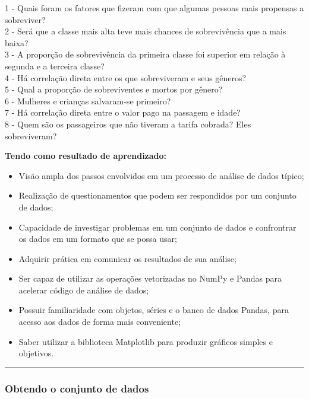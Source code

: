 \documentclass[11pt]{article}
\providecommand{\tightlist}{%
      \setlength{\itemsep}{0pt}\setlength{\parskip}{0pt}}
\begin{document}
1 - Quais foram os fatores que fizeram com que algumas pessoas mais
propensas a sobreviver?\\
2 - Será que a classe mais alta teve mais chances de sobrevivência que a
mais baixa?\\
3 - A proporção de sobrevivência da primeira classe foi superior em
relação à segunda e a terceira classe?\\
4 - Há correlação direta entre os que sobreviveram e seus gêneros?\\
5 - Qual a proporção de sobreviventes e mortos por gênero?\\
6 - Mulheres e crianças salvaram-se primeiro?\\
7 - Há correlação direta entre o valor pago na passagem e idade?\\
8 - Quem são os passageiros que não tiveram a tarifa cobrada? Eles
sobreviveram?

\textbf{Tendo como resultado de aprendizado:}

\begin{itemize}
\tightlist
\item
  Visão ampla dos passos envolvidos em um processo de análise de dados
  típico;
\item
  Realização de questionamentos que podem ser respondidos por um
  conjunto de dados;
\item
  Capacidade de investigar problemas em um conjunto de dados e
  confrontrar os dados em um formato que se possa usar;
\item
  Adquirir prática em comunicar os resultados de sua análise;
\item
  Ser capaz de utilizar as operações vetorizadas no NumPy e Pandas para
  acelerar código de análise de dados;
\item
  Possuir familiaridade com objetos, séries e o banco de dados Pandas,
  para acesso aos dados de forma mais conveniente;
\item
  Saber utilizar a biblioteca Matplotlib para produzir gráficos simples
  e objetivos.
\end{itemize}

\begin{center}\rule{0.5\linewidth}{\linethickness}\end{center}

\subsubsection{Obtendo o conjunto de
dados}\label{obtendo-o-conjunto-de-dados}
\end{document}
